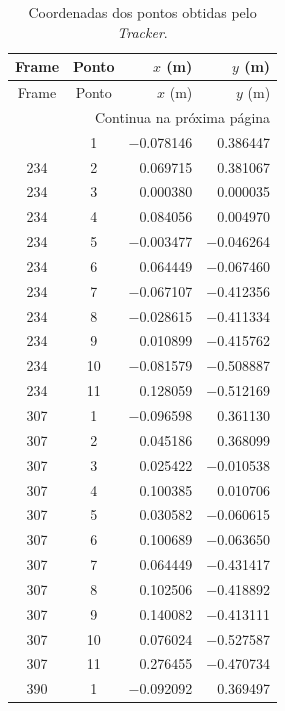 \documentclass[12pt,a4paper,twoside]{article}
\numberwithin{equation}{section}
\begin{document}
{\small
\begin{longtable}{cc rr}
  \caption{Coordenadas dos pontos obtidas pelo \emph{Tracker}.}\label{tab:tracker}\\
  \toprule
  Frame & Ponto & $x$ (m) & $y$ (m) \\
  \midrule
  \endfirsthead
  \toprule
  Frame & Ponto & $x$ (m) & $y$ (m) \\
  \midrule
  \endhead
  \midrule
  \multicolumn{4}{r}{Continua na próxima página}\\
  \endfoot
  \bottomrule
  \endlastfoot
    234 & 1 & \ensuremath{-}0.078146 & 0.386447 \\
    234 & 2 & 0.069715 & 0.381067 \\
    234 & 3 & 0.000380 & 0.000035 \\
    234 & 4 & 0.084056 & 0.004970 \\
    234 & 5 & \ensuremath{-}0.003477 & \ensuremath{-}0.046264 \\
    234 & 6 & 0.064449 & \ensuremath{-}0.067460 \\
    234 & 7 & \ensuremath{-}0.067107 & \ensuremath{-}0.412356 \\
    234 & 8 & \ensuremath{-}0.028615 & \ensuremath{-}0.411334 \\
    234 & 9 & 0.010899 & \ensuremath{-}0.415762 \\
    234 & 10 & \ensuremath{-}0.081579 & \ensuremath{-}0.508887 \\
    234 & 11 & 0.128059 & \ensuremath{-}0.512169 \\
    307 & 1 & \ensuremath{-}0.096598 & 0.361130 \\
    307 & 2 & 0.045186 & 0.368099 \\
    307 & 3 & 0.025422 & \ensuremath{-}0.010538 \\
    307 & 4 & 0.100385 & 0.010706 \\
    307 & 5 & 0.030582 & \ensuremath{-}0.060615 \\
    307 & 6 & 0.100689 & \ensuremath{-}0.063650 \\
    307 & 7 & 0.064449 & \ensuremath{-}0.431417 \\
    307 & 8 & 0.102506 & \ensuremath{-}0.418892 \\
    307 & 9 & 0.140082 & \ensuremath{-}0.413111 \\
    307 & 10 & 0.076024 & \ensuremath{-}0.527587 \\
    307 & 11 & 0.276455 & \ensuremath{-}0.470734 \\
    390 & 1 & \ensuremath{-}0.092092 & 0.369497 \\

\end{longtable}}
\end{document}
